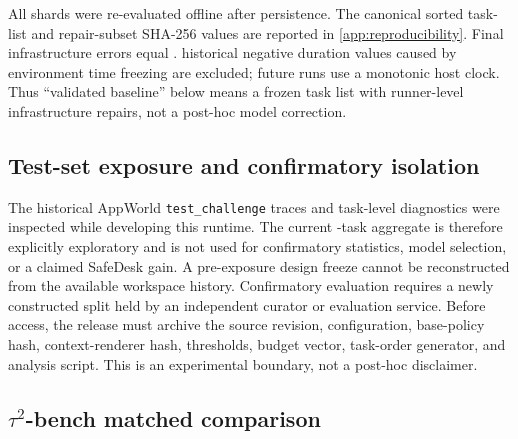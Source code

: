 \documentclass[10pt]{article}
\newcommand{\code}[1]{\texttt{#1}}
\begin{document}
All \AWShardCount{} shards were re-evaluated offline after persistence. The canonical sorted
task-list and repair-subset SHA-256 values are reported in
\cref{app:reproducibility}. Final infrastructure errors equal
\AWFinalInfraErrorCount{}. \AWInvalidDurationCount{} historical negative duration values caused by
environment time freezing are excluded; future runs use a monotonic host clock.
Thus ``validated baseline'' below means a frozen task list with runner-level
infrastructure repairs, not a post-hoc model correction.

\subsection{Test-set exposure and confirmatory isolation}

The historical AppWorld \code{test\_challenge} traces and task-level diagnostics
were inspected while developing this runtime. The current \AWTaskCount{}-task
aggregate is therefore explicitly exploratory and is not used for confirmatory
statistics, model selection, or a claimed SafeDesk gain. A pre-exposure design
freeze cannot be reconstructed from the available workspace history. Confirmatory
evaluation requires a newly constructed split held by an independent curator or
evaluation service. Before access, the release must archive the source
revision, configuration, base-policy hash, context-renderer hash, thresholds,
budget vector, task-order generator, and analysis script. This is an experimental
boundary, not a post-hoc disclaimer.

\subsection{\texorpdfstring{$\tau^2$-bench}{tau2-bench} matched comparison}
\end{document}
